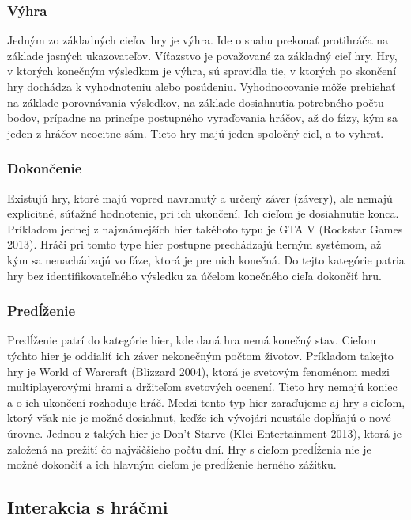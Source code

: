 \documentclass[10pt,twoside,slovak,a4paper]{article}
\begin{document}
\subsubsection{Výhra}
Jedným zo základných cieľov hry je výhra.  Ide o snahu prekonať protihráča na základe jasných ukazovateľov. Víťazstvo je považované za základný cieľ hry. Hry,  v ktorých konečným výsledkom je výhra, sú spravidla tie, v ktorých po skončení hry dochádza k vyhodnoteniu alebo posúdeniu\cite{zagal2019ultimate}. Vyhodnocovanie môže prebiehať na základe porovnávania výsledkov, na základe dosiahnutia potrebného počtu bodov,  prípadne na princípe postupného vyraďovania hráčov, až do fázy, kým sa jeden z hráčov neocitne sám. Tieto hry majú jeden spoločný cieľ, a to vyhrať.

\subsubsection{Dokončenie}
Existujú hry, ktoré majú vopred navrhnutý a určený záver (závery), ale nemajú explicitné, súťažné hodnotenie, pri ich ukončení\cite{zagal2019ultimate}. Ich cieľom je dosiahnutie konca.  Príkladom jednej z najznámejších hier takéhoto typu je GTA V (Rockstar Games 2013).  Hráči pri tomto type hier postupne prechádzajú herným systémom, až kým sa nenachádzajú vo fáze, ktorá je pre nich konečná. Do tejto kategórie patria hry bez identifikovateľného výsledku za účelom konečného cieľa dokončiť hru.

\subsubsection{Predĺženie}
Predĺženie patrí do kategórie hier, kde daná hra nemá konečný stav. Cieľom týchto hier je oddialiť ich záver nekonečným počtom životov.  Príkladom takejto hry je World of Warcraft (Blizzard 2004), ktorá je svetovým fenoménom medzi multiplayerovými hrami a držiteľom svetových ocenení.  Tieto hry nemajú koniec a o ich ukončení rozhoduje hráč. Medzi tento typ hier zaraďujeme aj hry s cieľom, ktorý však nie je možné dosiahnuť, keďže ich vývojári neustále dopĺňajú o nové úrovne. Jednou z takých hier je Don't Starve (Klei Entertainment 2013), ktorá je založená na prežití čo najväčšieho počtu dní. Hry s cieľom predĺženia nie je možné dokončiť a ich hlavným cieľom je predĺženie herného zážitku.

\subsection{Interakcia s hráčmi}
\end{document}
